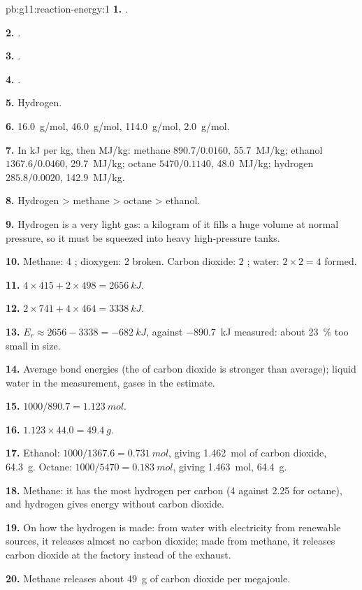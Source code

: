 \begin{solution}{pb:g11:reaction-energy:1}
\textbf{1.} .

\textbf{2.} .

\textbf{3.} .

\textbf{4.} .

\textbf{5.} Hydrogen.

\textbf{6.} \qty{16.0}{g/mol}, \qty{46.0}{g/mol}, \qty{114.0}{g/mol},
\qty{2.0}{g/mol}.

\textbf{7.} In \si{kJ} per \si{kg}, then \si{MJ/kg}: methane
$890.7 / 0.0160$, \qty{55.7}{MJ/kg}; ethanol $1367.6 / 0.0460$,
\qty{29.7}{MJ/kg}; octane $5470 / 0.1140$, \qty{48.0}{MJ/kg}; hydrogen
$285.8 / 0.0020$, \qty{142.9}{MJ/kg}.

\textbf{8.} Hydrogen > methane > octane > ethanol.

\textbf{9.} Hydrogen is a very light gas: a kilogram of it fills a huge
volume at normal pressure, so it must be squeezed into heavy
high-pressure tanks.

\textbf{10.} Methane: 4 ; dioxygen: 2  broken. Carbon
dioxide: 2 ; water: $2 \times 2 = 4$  formed.

\textbf{11.} $4 \times 415 + 2 \times 498 = \qty{2656}{kJ}$.

\textbf{12.} $2 \times 741 + 4 \times 464 = \qty{3338}{kJ}$.

\textbf{13.} $E_r \approx 2656 - 3338 = \qty{-682}{kJ}$, against
\qty{-890.7}{kJ} measured: about \qty{23}{\percent} too small in size.

\textbf{14.} Average bond energies (the  of carbon dioxide is
stronger than average); liquid water in the measurement, gases in the
estimate.

\textbf{15.} $1000 / 890.7 = \qty{1.123}{mol}$.

\textbf{16.} $1.123 \times 44.0 = \qty{49.4}{g}$.

\textbf{17.} Ethanol: $1000 / 1367.6 = \qty{0.731}{mol}$, giving
\qty{1.462}{mol} of carbon dioxide, \qty{64.3}{g}. Octane:
$1000 / 5470 = \qty{0.183}{mol}$, giving \qty{1.463}{mol}, \qty{64.4}{g}.

\textbf{18.} Methane: it has the most hydrogen  per carbon  (4
against 2.25 for octane), and  hydrogen gives energy without
carbon dioxide.

\textbf{19.} On how the hydrogen is made: from water with electricity
from renewable sources, it releases almost no carbon dioxide; made from
methane, it releases carbon dioxide at the factory instead of the
exhaust.

\textbf{20.} Methane releases about \qty{49}{g} of carbon dioxide per
megajoule.
\end{solution}
